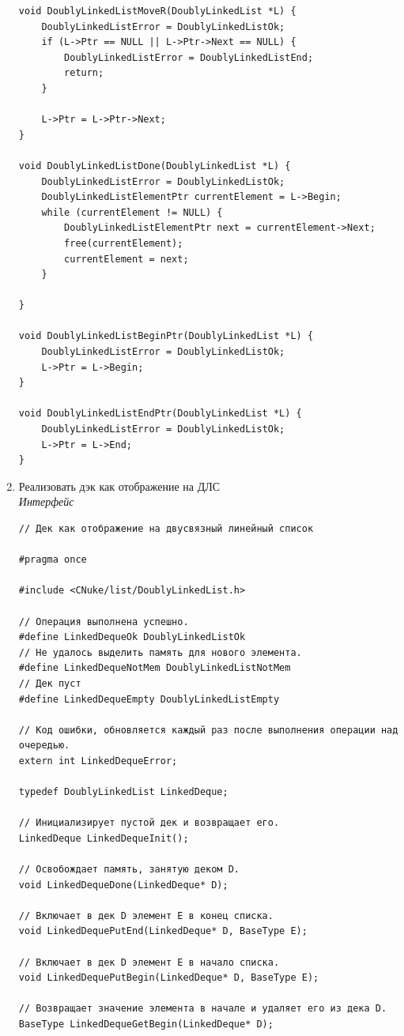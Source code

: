 \documentclass[a4paper,14pt]{extarticle}
\begin{document}
\begin{enumerate}
\begin{verbatim}
void DoublyLinkedListMoveR(DoublyLinkedList *L) {
    DoublyLinkedListError = DoublyLinkedListOk;
    if (L->Ptr == NULL || L->Ptr->Next == NULL) {
        DoublyLinkedListError = DoublyLinkedListEnd;
        return;
    }

    L->Ptr = L->Ptr->Next;
}

void DoublyLinkedListDone(DoublyLinkedList *L) {
    DoublyLinkedListError = DoublyLinkedListOk;
    DoublyLinkedListElementPtr currentElement = L->Begin;
    while (currentElement != NULL) {
        DoublyLinkedListElementPtr next = currentElement->Next;
        free(currentElement);
        currentElement = next;
    }
    
}

void DoublyLinkedListBeginPtr(DoublyLinkedList *L) {
    DoublyLinkedListError = DoublyLinkedListOk;
    L->Ptr = L->Begin;
}

void DoublyLinkedListEndPtr(DoublyLinkedList *L) {
    DoublyLinkedListError = DoublyLinkedListOk;
    L->Ptr = L->End;
}
    \end{verbatim}
    \item Реализовать дэк как отображение на ДЛС\\
	\textit{Интерфейс}
    \begin{verbatim}
// Дек как отображение на двусвязный линейный список

#pragma once

#include <CNuke/list/DoublyLinkedList.h>

// Операция выполнена успешно.
#define LinkedDequeOk DoublyLinkedListOk
// Не удалось выделить память для нового элемента.
#define LinkedDequeNotMem DoublyLinkedListNotMem
// Дек пуст
#define LinkedDequeEmpty DoublyLinkedListEmpty

// Код ошибки, обновляется каждый раз после выполнения операции над очередью.
extern int LinkedDequeError;

typedef DoublyLinkedList LinkedDeque;

// Инициализирует пустой дек и возвращает его.
LinkedDeque LinkedDequeInit();

// Освобождает память, занятую деком D.
void LinkedDequeDone(LinkedDeque* D);

// Включает в дек D элемент E в конец списка.
void LinkedDequePutEnd(LinkedDeque* D, BaseType E);

// Включает в дек D элемент E в начало списка.
void LinkedDequePutBegin(LinkedDeque* D, BaseType E);

// Возвращает значение элемента в начале и удаляет его из дека D.
BaseType LinkedDequeGetBegin(LinkedDeque* D);


\end{verbatim}
\end{enumerate}
\end{document}
